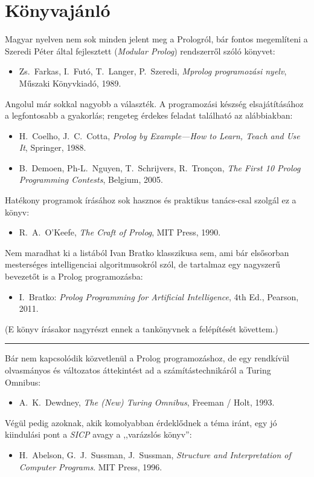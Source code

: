 \chapter{Könyvajánló}
Magyar nyelven nem sok minden jelent meg a Prologról, bár fontos
megemlíteni a Szeredi Péter által fejlesztett 
(\emph{Modular Prolog}) rendszerről szóló
könyvet:
\begin{itemize}
\item[] Zs.~Farkas, I.~Futó, T.~Langer, P.~Szeredi, \emph{Mprolog
programozási nyelv}, Műszaki Könyvkiadó, 1989.
\end{itemize}
Angolul már sokkal nagyobb a választék. A programozási készség
elsajátításához a legfontosabb a gyakorlás; rengeteg érdekes feladat
található az alábbiakban:
\begin{itemize}
\item[] H.~Coelho, J.~C.~Cotta, \emph{Prolog by Example---How to Learn, Teach and Use It}, Springer, 1988.
\item[] B.~Demoen, Ph-L.~Nguyen, T.~Schrijvers, R.~Tron\c con, \emph{The First 10 Prolog Programming Contests}, Belgium, 2005.
\end{itemize}
Hatékony programok írásához sok hasznos és praktikus tanács-csal szolgál ez a könyv:
\begin{itemize}
\item[] R.~A.~O'Keefe, \emph{The Craft of Prolog}, MIT Press, 1990.
\end{itemize}
Nem maradhat ki a listából Ivan Bratko klasszikusa sem,
ami bár elsősorban mesterséges intelligenciai algoritmusokról szól, de
tartalmaz egy nagyszerű bevezetőt is a Prolog programozásba:
\begin{itemize}
\item[] I.~Bratko: \emph{Prolog Programming for Artificial Intelligence}, 4th Ed., Pearson, 2011.
\end{itemize}
(E könyv írásakor nagyrészt ennek a tankönyvnek a felépítését követtem.)

\bigskip
\begin{center}
\rule{0.5\textwidth}{.5pt}
\end{center}
\bigskip

Bár nem kapcsolódik közvetlenül a Prolog programozáshoz, de egy
rendkívül olvasmányos és változatos áttekintést ad a
számítástechnikáról a Turing Omnibus:
\begin{itemize}
\item[] A.~K.~Dewdney, \emph{The (New) Turing Omnibus}, Freeman / Holt, 1993.
\end{itemize}
Végül pedig azoknak, akik komolyabban érdeklődnek a téma iránt, egy jó
kiindulási pont a \emph{SICP} avagy a ,,varázslós könyv'':
\begin{itemize}
\item[] H.~Abelson, G.~J.~Sussman, J.~Sussman, \emph{Structure and Interpretation of Computer Programs}. MIT Press, 1996.
\end{itemize}
